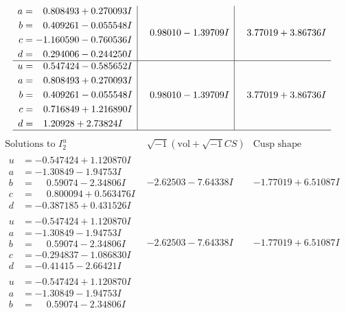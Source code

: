 \documentclass[1p]{elsarticle_modified}
\theoremstyle{definition}
\newcommand{\I}{\sqrt{-1}}
\begin{document}
$$\begin{array}{c|c|c}
\begin{aligned}
a &= \phantom{-}0.808493 + 0.270093 I \\
b &= \phantom{-}0.409261 - 0.055548 I \\
c &= -1.160590 - 0.760536 I \\
d &= \phantom{-}0.294006 - 0.244250 I\end{aligned}
 & \phantom{-}0.98010 - 1.39709 I & \phantom{-}3.77019 + 3.86736 I \\ \hline\begin{aligned}
u &= \phantom{-}0.547424 - 0.585652 I \\
a &= \phantom{-}0.808493 + 0.270093 I \\
b &= \phantom{-}0.409261 - 0.055548 I \\
c &= \phantom{-}0.716849 + 1.216890 I \\
d &= \phantom{-}1.20928 + 2.73824 I\end{aligned}
 & \phantom{-}0.98010 - 1.39709 I & \phantom{-}3.77019 + 3.86736 I\\
 \hline 
 \end{array}$$\newpage$$\begin{array}{c|c|c}  
\text{Solutions to }I^u_{2}& \I (\text{vol} + \sqrt{-1}CS) & \text{Cusp shape}\\
 \hline 
\begin{aligned}
u &= -0.547424 + 1.120870 I \\
a &= -1.30849 - 1.94753 I \\
b &= \phantom{-}0.59074 - 2.34806 I \\
c &= \phantom{-}0.800094 + 0.563476 I \\
d &= -0.387185 + 0.431526 I\end{aligned}
 & -2.62503 - 7.64338 I & -1.77019 + 6.51087 I \\ \hline\begin{aligned}
u &= -0.547424 + 1.120870 I \\
a &= -1.30849 - 1.94753 I \\
b &= \phantom{-}0.59074 - 2.34806 I \\
c &= -0.294837 - 1.086830 I \\
d &= -0.41415 - 2.66421 I\end{aligned}
 & -2.62503 - 7.64338 I & -1.77019 + 6.51087 I \\ \hline\begin{aligned}
u &= -0.547424 + 1.120870 I \\
a &= -1.30849 - 1.94753 I \\
b &= \phantom{-}0.59074 - 2.34806 I \\

\end{aligned}
\end{array}$$
\end{document}
